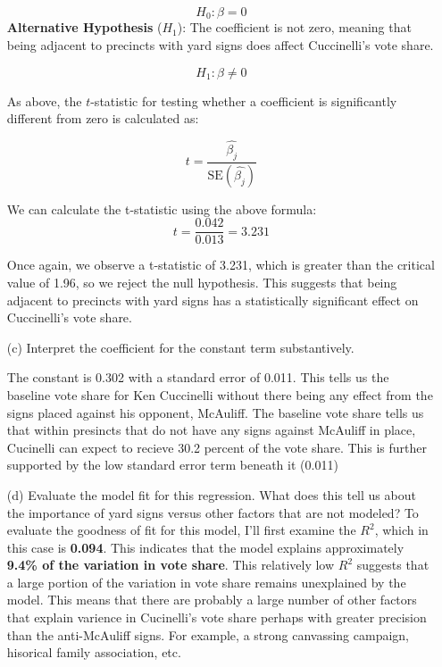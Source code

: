 \documentclass[12pt,letterpaper]{article}
\begin{document}
\begin{enumerate}
	\[
	H_0: \beta = 0
	\]
		\textbf{Alternative Hypothesis} (\( H_1 \)): The coefficient is not zero, meaning that being adjacent to precincts with yard signs does affect Cuccinelli’s vote share.
	
	\[
	H_1: \beta \neq 0
	\]
	 
	 As above, 	the \( t \)-statistic for testing whether a coefficient is significantly different from zero is calculated as:
	 
	 \[
	 t = \frac{\hat{\beta_j}}{\text{SE}(\hat{\beta_j})}
	 \]
	 
	 We can calculate the t-statistic using the above formula: 
	 \[
	 t = \frac{0.042}{0.013} = 3.231
	 \]
	 
	 Once again, we observe a t-statistic of 3.231, which is greater than the critical value of 1.96, so we reject the null hypothesis. This suggests that being adjacent to precincts with yard signs has a statistically significant effect on Cuccinelli’s vote share.
	 
	\vspace{1cm}
	\item [(c)] Interpret the coefficient for the constant term substantively.
	
	The constant is 0.302 with a standard error of 0.011. This tells us the baseline vote share for Ken Cuccinelli without there being any effect from the signs placed against his opponent, McAuliff. The baseline vote share tells us that within presincts that do not have any signs against McAuliff in place, Cucinelli can expect to recieve 30.2 percent of the vote share. This is further supported by the low standard error term beneath it (0.011)
	
	\vspace{1cm}
	
	\item [(d)] Evaluate the model fit for this regression.  What does this	tell us about the importance of yard signs versus other factors that are not modeled?
		\vspace{.5cm}
	To evaluate the goodness of fit for this model, I'll first examine the \( R^2 \), which in this case is \textbf{0.094}. This indicates that the model explains approximately \textbf{9.4\% of the variation in vote share}. This relatively low \( R^2 \) suggests that a large portion of the variation in vote share remains unexplained by the model. This means that there are probably a large number of other factors that explain varience in Cucinelli's vote share perhaps with greater precision than the anti-McAuliff signs. For example, a strong canvassing campaign, hisorical family association, etc. 
	
	
\end{enumerate}  
\end{document}

